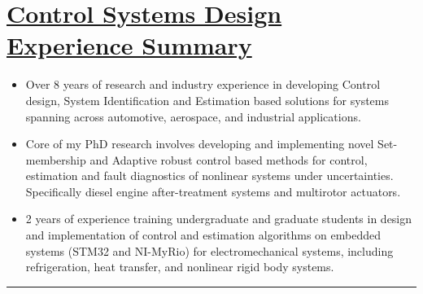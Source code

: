 \section*{\underline{Control Systems Design Experience Summary}}
\begin{itemize}
        \item Over 8 years of research and industry experience in developing Control design, System Identification and Estimation based solutions for systems spanning across automotive, aerospace, and industrial applications.
        \item Core of my PhD research involves developing and implementing novel Set-membership and Adaptive robust control based methods for control, estimation and fault diagnostics of nonlinear systems under uncertainties. Specifically diesel engine after-treatment systems and multirotor actuators.
        \item 2 years of experience training undergraduate and graduate students in design and implementation of control and estimation algorithms on embedded systems (STM32 and NI-MyRio) for electromechanical systems, including refrigeration, heat transfer, and nonlinear rigid body systems.
\end{itemize}

\noindent\rule{\textwidth}{0.4pt}
